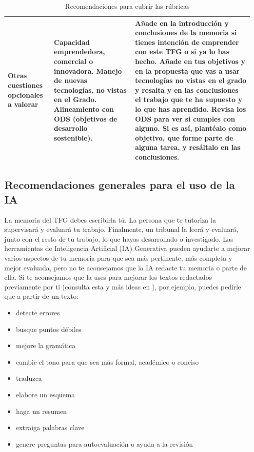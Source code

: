 {\begin{table}
{\begin{tabular}{|p{3cm} |p{5cm}| p{15cm}|}
Otras cuestiones opcionales a valorar & Capacidad emprendedora, comercial o innovadora. Manejo de nuevas tecnologías, no vistas en el Grado. Alineamiento con ODS (objetivos de desarrollo sostenible). & Añade en la introducción y conclusiones de la memoria si tienes intención de emprender con este TFG o si ya lo has hecho. Añade en tus objetivos y en la propuesta que vas a usar tecnologías no vistas en el grado y resalta y en las conclusiones el trabajo que te ha supuesto y lo que has aprendido. Revisa los ODS para ver si cumples con alguno. Si es así, plantéalo como objetivo, que forme parte de alguna tarea, y resáltalo en las conclusiones. \\  \hline
\end{tabular}
}
    \caption{Recomendaciones para cubrir las rúbricas}
    \label{tab:recomendaciones}
\end{table}


\subsection{Recomendaciones generales para el uso de la IA} %
La memoria del TFG debes escribirla tú. La persona que te tutoriza la supervisará y evaluará tu trabajo. Finalmente, un tribunal la leerá y evaluará, junto con el resto de tu trabajo, lo que hayas desarrollado o investigado. Las herramientas de Inteligencia Artificial (IA) Generativa pueden ayudarte a mejorar varios aspectos de tu memoria para que sea más pertinente, más completa y mejor evaluada, pero no te aconsejamos que la IA redacte tu memoria o parte de ella. Sí te aconsejamos que la uses para mejorar los textos redactados previamente por ti (consulta esta y más ideas en \cite{IAGenerativaUNED}), por ejemplo, puedes pedirle que a partir de un texto: 
\begin{itemize}  
    \item detecte errores
    \item busque puntos débiles
    \item mejore la gramática
    \item cambie el tono para que sea más formal, académico o conciso
    \item traduzca 
    \item elabore un esquema
    \item haga un resumen
    \item extraiga palabras clave
    \item genere preguntas para autoevaluación o ayuda a la revisión 
\end{itemize} 

}
